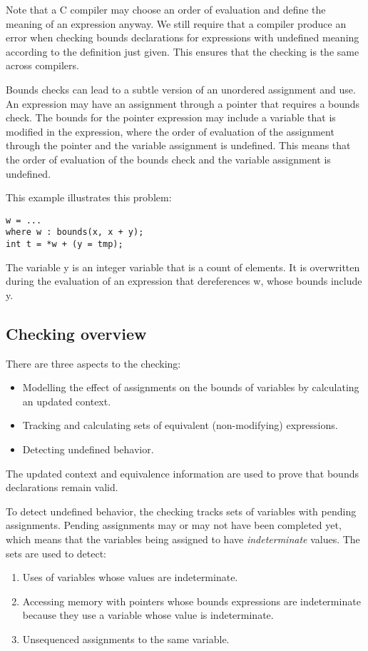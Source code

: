 Note that a C compiler may choose an order of evaluation and
define the meaning of an expression anyway.  We still
require that a compiler produce an error when checking
bounds declarations for expressions with undefined meaning
according to the definition just given.  This ensures that the checking
is the same across compilers.

Bounds checks can lead to a subtle version of an unordered assignment
and use.  An expression may have an assignment through a pointer that requires a
bounds check. The bounds for the pointer expression may include a
variable that is modified in the expression, where the order of
evaluation of the assignment through the pointer and the variable
assignment is undefined. This means that the order of evaluation of the
bounds check and the variable assignment is undefined.

This example illustrates this problem:

\begin{lstlisting}
w = ...
where w : bounds(x, x + y);
int t = *w + (y = tmp);
\end{lstlisting}

The variable y is an integer variable that is a count of elements. It is
overwritten during the evaluation of an expression that dereferences w,
whose bounds include y.

\subsection{Checking overview}
There are three aspects to the checking:
\begin{itemize}
\item Modelling the effect of assignments on the bounds
of variables by calculating an updated context.
\item Tracking and calculating sets of equivalent (non-modifying) expressions.
\item Detecting undefined behavior.
\end{itemize}
The updated context and equivalence information are used to prove that bounds
declarations remain valid. 

To detect undefined behavior, the checking tracks
sets of variables with pending assignments.  Pending
assignments may or may not have been completed yet, which means
that the variables being assigned to have {\em indeterminate}
values.  The sets are used to detect:
\begin{enumerate}
\item Uses of variables whose values are indeterminate.
\item Accessing memory with pointers whose bounds expressions
are indeterminate because they use a variable whose value is indeterminate.
\item Unsequenced assignments to the same variable.
\end{enumerate}

